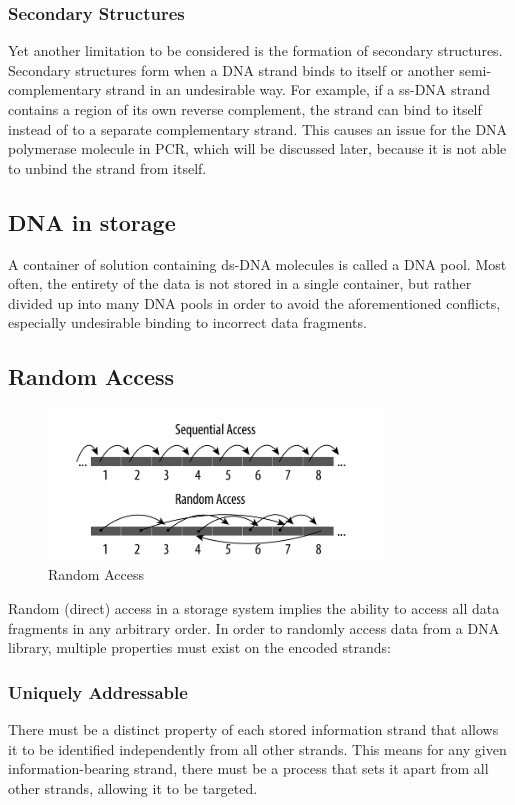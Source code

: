 \documentclass[a4paper,conference]{IEEEtran}
\begin{document}
\subsubsection{Secondary Structures}
Yet another limitation to be considered is the formation of secondary structures. Secondary structures form when a DNA strand binds to itself or another semi-complementary strand in an undesirable way. For example, if a ss-DNA strand contains a region of its own reverse complement, the strand can bind to itself instead of to a separate complementary strand. This causes an issue for the DNA polymerase molecule in PCR, which will be discussed later, because it is not able to unbind the strand from itself.

\subsection{DNA in storage}
A container of solution containing ds-DNA molecules is called a DNA pool. Most often, the entirety of the data is not stored in a single container, but rather divided up into many DNA pools in order to avoid the aforementioned conflicts, especially undesirable binding to incorrect data fragments.

\subsection{Random Access}
\begin{figure}
\centering
\includegraphics[width=3.5in]{randomaccess}
\caption{Random Access}
\label{randomaccess}
\end{figure}

Random (direct) access in a storage system implies the ability to access all data fragments in any arbitrary order. In order to randomly access data from a DNA library, multiple properties must exist on the encoded strands:

\subsubsection{Uniquely Addressable}
There must be a distinct property of each stored information strand that allows it to be identified independently from all other strands. This means for any given information-bearing strand, there must be a process that sets it apart from all other strands, allowing it to be targeted.
\end{document}

